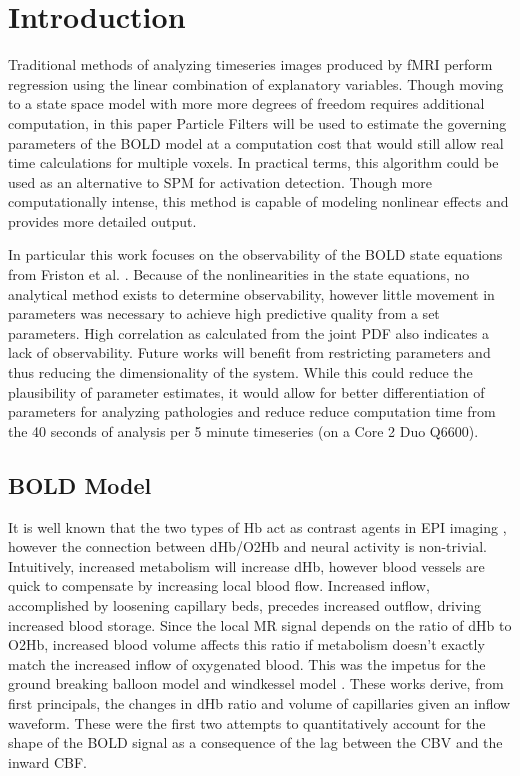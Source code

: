 \documentclass{article}
\begin{document}
\section{Introduction}
\label{sec:intro}
Traditional methods of analyzing timeseries images produced by 
\ac{fMRI} perform regression using the linear combination of explanatory variables. 
Though moving to a state space model with more more degrees of freedom 
requires additional computation, in this paper Particle Filters will
be used to estimate the governing parameters of the \ac{BOLD} model 
at a computation cost 
that would still allow real time calculations for multiple voxels.
In practical terms, this algorithm could be used as an alternative to \ac{SPM}
for activation detection. Though more computationally intense,
this method is capable of modeling nonlinear effects
and provides more detailed output. 

In particular this work focuses
on the observability of the \ac{BOLD} state equations from Friston et al.
\cite{Friston2000}. Because of the nonlinearities in the state equations,
no analytical method exists to determine observability, however little
movement in parameters was necessary to achieve high predictive quality from a
set parameters. High correlation as calculated from the joint \ac{PDF}
also indicates a lack of observability.  Future works will benefit from
restricting parameters and thus reducing the dimensionality of the system.
While this could reduce the plausibility of parameter estimates, it would
allow for better differentiation of parameters for analyzing pathologies
and reduce reduce computation time from the 40 seconds of analysis
per 5 minute timeseries (on a Core 2 Duo Q6600).

\subsection{BOLD Model}
It is well known that the two types of \ac{Hb} act as contrast agents in 
\ac{EPI} imaging \cite{Buxton1998, WEISSKOFF1994, Ogawa}, however the connection
between \ac{dHb}/\ac{O2Hb} and neural activity is non-trivial. 
Intuitively, increased 
metabolism will increase \ac{dHb}, however blood vessels are quick
to compensate by increasing local blood flow. Increased inflow, accomplished by loosening 
capillary beds, precedes increased outflow, driving increased 
blood storage.
Since the local \ac{MR} signal depends on the ratio of \ac{dHb} to \ac{O2Hb},
increased blood volume affects this ratio if 
metabolism doesn't exactly match the increased inflow of oxygenated blood.
This was the impetus
for the ground breaking balloon model \cite{Buxton1998} and windkessel
model \cite{Mandeville1999}. These works derive, from first principals,
the changes in \ac{dHb} ratio and volume of capillaries given an inflow waveform.
These were the first two attempts to quantitatively account for the shape of the 
\ac{BOLD} signal as a consequence of the lag between the \ac{CBV}
and the inward \ac{CBF}. 
\end{document}

